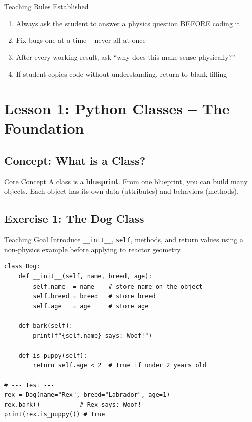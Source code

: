 \documentclass[12pt,a4paper]{article}
\begin{document}
\begin{warnbox}{Teaching Rules Established}
\begin{enumerate}
  \item Always ask the student to answer a physics question BEFORE coding it
  \item Fix bugs one at a time -- never all at once
  \item After every working result, ask ``why does this make sense physically?''
  \item If student copies code without understanding, return to blank-filling
\end{enumerate}
\end{warnbox}

\section{Lesson 1: Python Classes -- The Foundation}

\subsection{Concept: What is a Class?}

\begin{physicsbox}{Core Concept}
A class is a \textbf{blueprint}. From one blueprint, you can build many objects.
Each object has its own data (attributes) and behaviors (methods).
\end{physicsbox}

\subsection{Exercise 1: The Dog Class}

\begin{lessonbox}{Teaching Goal}
Introduce \texttt{\_\_init\_\_}, \texttt{self}, methods, and return values
using a non-physics example before applying to reactor geometry.
\end{lessonbox}

\begin{lstlisting}[caption={Dog Class -- First Exercise}]
class Dog:
    def __init__(self, name, breed, age):
        self.name  = name    # store name on the object
        self.breed = breed   # store breed
        self.age   = age     # store age

    def bark(self):
        print(f"{self.name} says: Woof!")

    def is_puppy(self):
        return self.age < 2  # True if under 2 years old

# --- Test ---
rex = Dog(name="Rex", breed="Labrador", age=1)
rex.bark()           # Rex says: Woof!
print(rex.is_puppy()) # True
\end{lstlisting}
\end{document}
